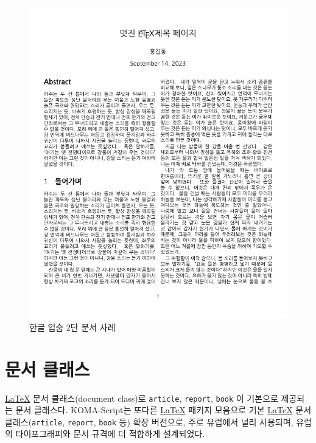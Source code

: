 \documentclass[
  letterpaper,
]{book}
\begin{document}
\begin{figure}

{\centering \includegraphics{images/pdf_ipsum_kor.jpg}

}

\caption{한글 입숨 2단 문서 사례}

\end{figure}

\hypertarget{uxbb38uxc11c-uxd074uxb798uxc2a4-1}{%
\section{문서 클래스}\label{uxbb38uxc11c-uxd074uxb798uxc2a4-1}}

\href{http://example.org}{\LaTeX} 문서 클래스(document class)로
\texttt{article}, \texttt{report}, \texttt{book} 이 기본으로 제공되는
문서 클래스다. KOMA-Script는 또다른 \href{http://example.org}{\LaTeX}
패키지 모음으로 기본 \href{http://example.org}{\LaTeX} 문서
클래스(\texttt{article}, \texttt{report}, \texttt{book} 등) 확장
버전으로, 주로 유럽에서 널리 사용되며, 유럽의 타이포그래피와 문서 규격에
더 적합하게 설계되었다.
\end{document}
